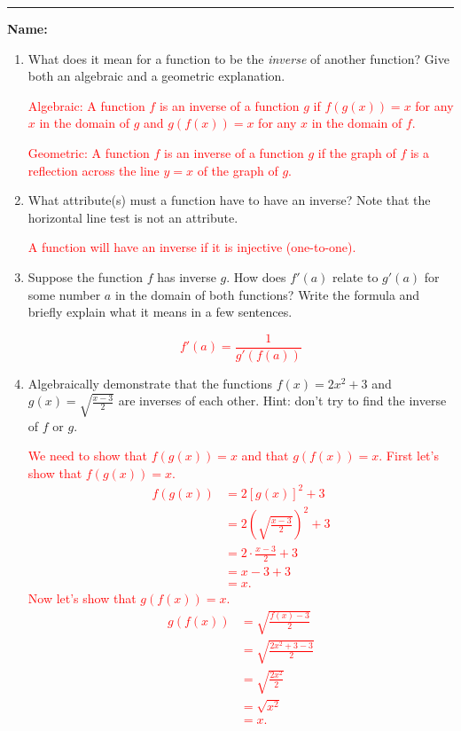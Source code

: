 \documentclass[11pt]{article}
\let\ds\displaystyle
\newcommand{\red}{\textcolor{red}}
\begin{document}
    \hrule
    \vspace{.5cm}
    \noindent\textbf{Name:} \underline{\qquad\qquad\qquad\qquad\qquad\qquad\qquad\qquad\qquad\qquad\qquad\qquad\qquad}

    \begin{enumerate}
        \item What does it mean for a function to be the \textit{inverse} of another function? Give both an algebraic and a geometric explanation.
        
        \red{Algebraic: A function $f$ is an inverse of a function $g$ if $f(g(x))=x$ for any $x$ in the domain of $g$ and $g(f(x))=x$ for any $x$ in the domain of $f$.}
        

        \red{Geometric: A function $f$ is an inverse of a function $g$ if the graph of $f$ is a reflection across the line $y=x$ of the graph of $g$.}
        
        \item What attribute(s) must a function have to have an inverse? Note that the horizontal line test is not an attribute.
        

        \red{A function will have an inverse if it is injective (one-to-one).}
        
        \item Suppose the function $f$ has inverse $g$. How does $f'(a)$ relate to $g'(a)$ for some number $a$ in the domain of both functions? Write the formula and briefly explain what it means in a few sentences.
        
        \red{$$f'(a)=\frac{1}{g'(f(a))}$$}
        
        \item Algebraically demonstrate that the functions $f(x)=2x^{2}+3$ and $g(x)=\ds\sqrt{\frac{x-3}{2}}$ are inverses of each other. Hint: don't try to find the inverse of $f$ or $g$.
        
        \red{We need to show that $f(g(x))=x$ and that $g(f(x))=x$. First let's show that $f(g(x))=x$.}
        \textcolor{red}{
            \begin{align*}
                f(g(x)) &=  2\left[g(x)\right]^2+3\\
                        &=  2\left(\sqrt{\frac{x-3}{2}}\right)^{2}+3\\
                        &=  2\cdot\frac{x-3}{2}+3\\
                        &=  x-3+3\\
                        &=  x.
            \end{align*}
        }
        \red{Now let's show that $g(f(x))=x$.}
        \textcolor{red}{
            \begin{align*}
                g(f(x)) &=  \sqrt{\frac{f(x)-3}{2}}\\
                        &=  \sqrt{\frac{2x^{2}+3-3}{2}}\\
                        &=  \sqrt{\frac{2x^{2}}{2}}\\
                        &=  \sqrt{x^{2}}\\
                        &=  x.
            \end{align*}
        }


\end{enumerate}
\end{document}
